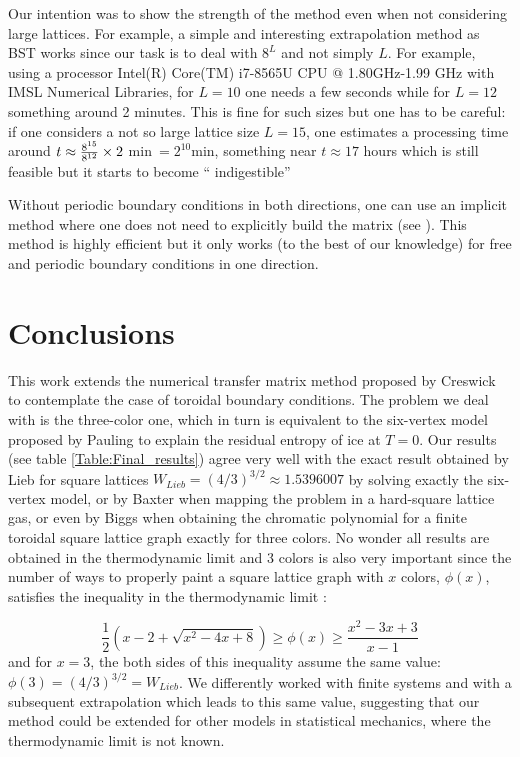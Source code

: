 \documentclass[3p, 10pt, onecolumn]{elsarticle}
\begin{document}
Our intention was to show the strength of the method even when not
considering large lattices. For example, a simple and interesting
extrapolation method as BST works since our task is to deal with $8^{L}$ and
not simply $L$. For example, using a processor Intel(R) Core(TM) i7-8565U
CPU @ 1.80GHz-1.99 GHz with IMSL Numerical Libraries, for $L=10$ one needs a
few seconds while for $L=12$ something around 2 minutes. This is fine for
such sizes but one has to be careful: if one considers a not so large
lattice size $L=15$, one estimates a processing time around $t\approx \frac{%
8^{15}}{8^{12}}\times 2\ $min$\ =2^{10}$min, something near $t\approx 17$
hours which is still feasible but it starts to become \textquotedblleft
indigestible\textquotedblright 

Without periodic boundary conditions in both directions, one can use an
implicit method where one does not need to explicitly build the matrix (see 
\cite{rdasilvaEJP}). This method is highly efficient but it only works (to
the best of our knowledge) for free and periodic boundary conditions in one
direction.

\section{Conclusions}

This work extends the numerical transfer matrix method proposed by Creswick 
\cite{Creswick} to contemplate the case of toroidal boundary conditions. The
problem we deal with is the three-color one, which in turn is equivalent to
the six-vertex model proposed by Pauling to explain the residual entropy of
ice at $T=0$. Our results (see table \ref{Table:Final_results}) agree very
well with the exact result obtained by Lieb \cite{Lieb-I,Lieb-II} for square
lattices $W_{Lieb}=(4/3)^{3/2}\approx 1.5396007$ by solving exactly the
six-vertex model, or by Baxter \cite{Baxter} when mapping the problem in a
hard-square lattice gas, or even by Biggs \cite{Biggs} when obtaining the
chromatic polynomial for a finite toroidal square lattice graph exactly for
three colors. No wonder all results are obtained in the thermodynamic limit
and 3 colors is also very important since the number of ways to properly
paint a square lattice graph with $x$ colors, $\phi (x)$, satisfies the
inequality in the thermodynamic limit \cite{Biggs}:

\begin{equation*}
\frac{1}{2}(x-2+\sqrt{x^{2}-4x+8})\geq \phi (x)\geq \frac{x^{2}-3x+3}{x-1}
\end{equation*}%
and for $x=3$, the both sides of this inequality assume the same value: $%
\phi (3)=(4/3)^{3/2}=W_{Lieb}$. We differently worked with finite systems
and with a subsequent extrapolation which leads to this same value,
suggesting that our method could be extended for other models in statistical
mechanics, where the thermodynamic limit is not known.
\end{document}
